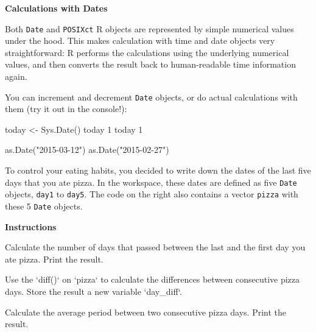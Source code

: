 \documentclass[]{article}
\newcommand{\hlnum}[1]{\textcolor[rgb]{0.816,0.125,0.439}{#1}}%
\newcommand{\hlstr}[1]{\textcolor[rgb]{0.251,0.627,0.251}{#1}}%
\newcommand{\hlstd}[1]{\textcolor[rgb]{0.251,0.251,0.251}{#1}}%
\newcommand{\hlkwc}[1]{\textcolor[rgb]{0.251,0.251,0.251}{#1}}%
\newcommand{\hlkwd}[1]{\textcolor[rgb]{0.878,0.439,0.125}{#1}}%
\newenvironment{Shaded}{\begin{myshaded}}{\end{myshaded}}
\newcommand{\KeywordTok}[1]{\hlkwd{#1}}
\newcommand{\DataTypeTok}[1]{\hlkwc{#1}}
\newcommand{\DecValTok}[1]{\hlnum{#1}}
\newcommand{\StringTok}[1]{\hlstr{#1}}
\newcommand{\NormalTok}[1]{\hlstd{#1}}
\begin{document}
\textbf{Calculations with Dates}

Both \texttt{Date} and \texttt{POSIXct} R objects are represented by
simple numerical values under the hood. This makes calculation with time
and date objects very straightforward: R performs the calculations using
the underlying numerical values, and then converts the result back to
human-readable time information again.

You can increment and decrement \texttt{Date} objects, or do actual
calculations with them (try it out in the console!):

\begin{Shaded}
\begin{Highlighting}[]
\NormalTok{today <-}\StringTok{ }\KeywordTok{Sys.Date}\NormalTok{()}
\NormalTok{today }\OperatorTok{+}\StringTok{ }\DecValTok{1}
\NormalTok{today }\OperatorTok{-}\StringTok{ }\DecValTok{1}

\KeywordTok{as.Date}\NormalTok{(}\StringTok{"2015-03-12"}\NormalTok{) }\OperatorTok{-}\StringTok{ }\KeywordTok{as.Date}\NormalTok{(}\StringTok{"2015-02-27"}\NormalTok{)}
\end{Highlighting}
\end{Shaded}

To control your eating habits, you decided to write down the dates of
the last five days that you ate pizza. In the workspace, these dates are
defined as five \texttt{Date} objects, \texttt{day1} to \texttt{day5}.
The code on the right also contains a vector \texttt{pizza} with these 5
\texttt{Date} objects.

\textbf{Instructions}

\begin{Shaded}
\begin{Highlighting}[]
\OperatorTok{*}\StringTok{ }\NormalTok{Calculate the number of days that passed between the last and the first day you ate pizza. Print the result.}

\OperatorTok{*}\StringTok{ }\NormalTok{Use the } \StringTok{`}\DataTypeTok{diff()}\StringTok{`}\NormalTok{ on }\StringTok{`}\DataTypeTok{pizza}\StringTok{`}\NormalTok{ to calculate the differences between consecutive pizza days. Store the result }\NormalTok{ a new variable }\StringTok{`}\DataTypeTok{day_diff}\StringTok{`}\NormalTok{.}

\OperatorTok{*}\StringTok{ }\NormalTok{Calculate the average period between two consecutive pizza days. Print the result.}
\end{Highlighting}
\end{Shaded}
\end{document}
